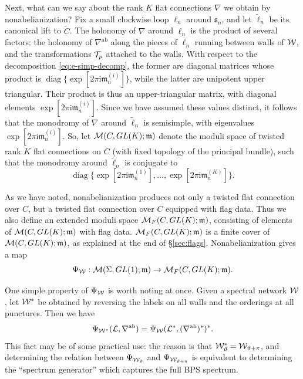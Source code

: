 \documentclass[11pt,a4paper]{article}
\def\CM {{\cal M}}
\def\CL {{\cal L}}
\def\wnet {{\cal W}}
\def\CT{{\cal T}}
\def\ab{{\mathrm{ab}}}
\def\fm{\mathfrak{m}}
\def\fs{\mathfrak{s}}
\def\CM {{\cal M}}
\def\CL {{\cal L}}
\def\wnet {{\cal W}}
\def\CT{{\cal T}}
\newcommand\I{{\mathrm i}}
\DeclareMathOperator{\diag}{{diag}}
\begin{document}
Next, what can we say about the rank $K$ flat connections $\nabla$ we obtain
by nonabelianization?
Fix a small clockwise loop $\ell_n$ around $\fs_n$, and let $\tilde \ell_n$
be its canonical lift to $\tilde C$.
The holonomy of $\nabla$ around $\ell_n$
is the product of several factors:  the holonomy of $\nabla^\ab$ along the
pieces of $\ell_n$ running between walls of $\wnet$, and the
transformations $\CT_p$ attached to the walls.  With respect to the decomposition
\eqref{eq:e-simp-decomp}, the former are diagonal matrices whose product is
$\diag \{\exp[ 2\pi \I \fm_n^{(i)}] \}$, while the latter are unipotent
upper triangular.  Their product is thus an upper-triangular matrix, with
diagonal elements $\exp[ 2\pi \I \fm_n^{(i)} ]$.
Since we have assumed these values
distinct, it follows that the monodromy of $\nabla$ around $\tilde \ell_n$
is semisimple, with eigenvalues $\exp[ 2\pi \I \fm_n^{(i)} ]$.
So, let $\CM(C, GL(K);\mathfrak{m})$
denote the moduli space of twisted rank $K$ flat connections on $C$
(with fixed topology of the principal bundle),
such that the monodromy around $\tilde \ell_n$ is conjugate to
\begin{equation}\label{eq:diag-elts-diag}
\diag \{ \exp[ 2\pi \I \fm_n^{(1)}], \dots,\exp[2\pi \I \fm_n^{(K)}] \}.
\end{equation}

As we have noted, nonabelianization produces not only a twisted flat connection over $C$,
but a twisted flat connection over $C$
equipped with flag data.  Thus we also define an extended moduli
space $\CM_F(C, GL(K);\mathfrak{m})$, consisting of elements of
$\CM(C, GL(K);\mathfrak{m})$ with flag data.
$\CM_F(C, GL(K);\mathfrak{m})$ is a finite cover of $\CM(C, GL(K);\mathfrak{m})$,
as explained at the end of \S\ref{sec:flags}.
Nonabelianization gives a map
\begin{equation}\label{eq:Psi-MAP}
\Psi_{\wnet}: \CM(\Sigma, GL(1); \mathfrak{m} )\to \CM_F(C, GL(K); \mathfrak{m}).
\end{equation}

One simple property of $\Psi_\wnet$ is worth noting at once.  Given a spectral network $\wnet$,
let $\wnet^*$ be obtained by reversing the labels on all walls and the orderings at all punctures.
Then we have
\begin{equation}
 \Psi_{\wnet^*}(\CL, \nabla^\ab) = \Psi_{\wnet}(\CL^*, (\nabla^\ab)^*)^*.
\end{equation}
This fact may be of some practical use:  the reason is that $\wnet_\vartheta^* = \wnet_{\vartheta + \pi}$,
and determining the relation between $\Psi_{\wnet_\vartheta}$ and $\Psi_{\wnet_{\vartheta+\pi}}$ is equivalent to
determining the ``spectrum generator'' which captures the full BPS spectrum.
\end{document}
